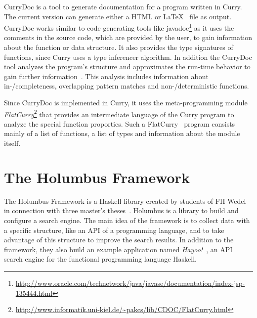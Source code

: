 \documentclass[%
	latex,%
	a4paper,%
	oneside,%
	chapterprefix,%
	headsepline,%
	12pt%
]{scrbook}
\begin{document}
CurryDoc is a tool to generate documentation for a program written in
Curry. %
The current version can generate either a HTML or \LaTeX~ file as
output. %
CurryDoc works similar to code generating tools like
javadoc\footnote{\url{http://www.oracle.com/technetwork/java/javase/documentation/index-jsp-135444.html}}
as it uses the comments in the source code, which are provided by the
user, to gain information about the function or data structure. %
It also provides the type signatures of functions, since Curry uses a
type inferencer algorithm. %
In addition the CurryDoc tool analyzes the program's structure and
approximates the run-time behavior to gain further
information~\cite{currydoc2}. %
This analysis includes information about in-/completeness, overlapping
pattern matches and non-/deterministic functions. %

Since CurryDoc is implemented in Curry, it uses the meta-programming
module
\emph{FlatCurry}\footnote{\url{http://www.informatik.uni-kiel.de/~pakcs/lib/CDOC/FlatCurry.html}}
that provides an intermediate language of the Curry program to analyze
the special function proporties. %
Such a FlatCurry~\cite{flat} program consists mainly of a list of
functions, a list of types and information about the module itself. %


\section{The Holumbus Framework}\label{preliminaries:holumbus}
The Holumbus Framework is a Haskell library created by students of FH
Wedel in connection with three master's theses~\cite{searchingthesis}\cite{indexingthesis}. %
Holumbus is a library to build and configure a search engine. %
The main idea of the framework is to collect data with a specific
structure, like an API of a programming language, and to take
advantage of this structure to improve the search results. %
In addition to the framework, they also build an example application
named \emph{Hayoo!}~\cite{hayoo}, an API search engine for the
functional programming language Haskell. %
\end{document}
